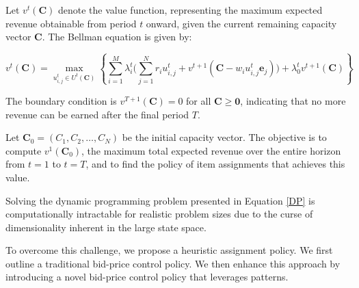 Let $v^{t}(\mathbf{C})$ denote the value function, representing the maximum expected revenue obtainable from period $t$ onward, given the current remaining capacity vector $\mathbf{C}$. The Bellman equation is given by:

\begin{equation}\label{DP}
v^{t}(\mathbf{C}) = \max_{u_{i,j}^{t} \in U^{t}(\mathbf{C})}\left\{\sum_{i=1}^{M} \lambda_i^{t} \bigl( \sum_{j=1}^{N} r_i u_{i,j}^{t} + v^{t+1}(\mathbf{C} - w_i u_{i,j}^{t}\mathbf{e}_j)\bigr) + \lambda_0^{t} v^{t+1}(\mathbf{C})\right\}
\end{equation}

The boundary condition is $v^{T+1}(\mathbf{C}) = 0$ for all $\mathbf{C} \geq \mathbf{0}$, indicating that no more revenue can be earned after the final period $T$.

Let $\mathbf{C}_0 = (C_1, C_2, \ldots, C_N)$ be the initial capacity vector. The objective is to compute $v^{1}(\mathbf{C}_0)$, the maximum total expected revenue over the entire horizon from $t=1$ to $t=T$, and to find the policy of item assignments that achieves this value.


Solving the dynamic programming problem presented in Equation \eqref{DP} is computationally intractable for realistic problem sizes due to the curse of dimensionality inherent in the large state space.

To overcome this challenge, we propose a heuristic assignment policy. We first outline a traditional bid-price control policy. We then enhance this approach by introducing a novel bid-price control policy that leverages patterns.





